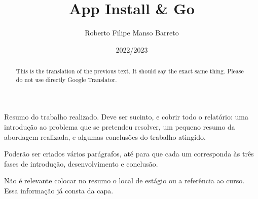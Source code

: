 \documentclass[a4paper,12pt,twoside]{book}
\title{App Install \& Go}
\author{Roberto Filipe Manso Barreto}
\date{2022/2023}
\begin{document}
\frontmatter

\maketitle


\begin{resumo}
Resumo do trabalho realizado. Deve ser sucinto, e cobrir todo o relatório: uma introdução ao problema que se pretendeu resolver, um pequeno resumo da abordagem realizada, e algumas conclusões do trabalho atingido.

Poderão ser criados vários parágrafos, até para que cada um corresponda às três fases de introdução, desenvolvimento e conclusão.

Não é relevante colocar no resumo o local de estágio ou a referência ao curso. Essa informação já consta da capa.
\end{resumo}

\begin{abstract}
This is the translation of the previous text. It should say the exact same thing. Please do not use directly Google Translator.
\end{abstract}

\begin{agradecimentos}
\end{agradecimentos}


\tableofcontents




%

%



 
\mainmatter


% 

% 
% 




\end{document}
